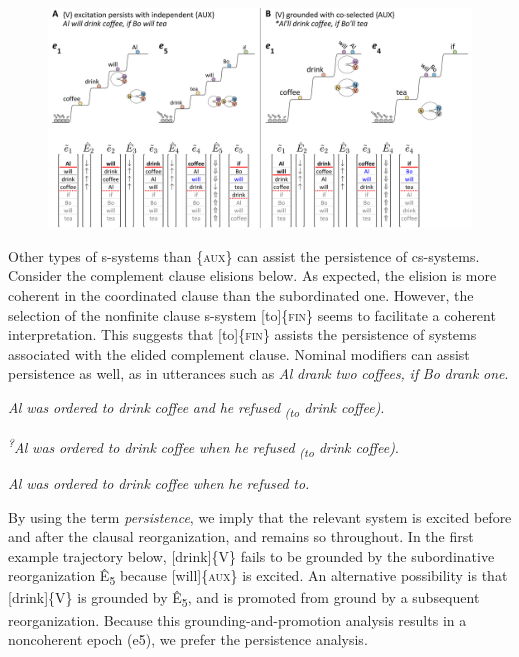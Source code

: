   
\begin{figure}
\includegraphics[width=\textwidth]{figures/Tilsen-img148.png}
\caption{\missingcaption}
\label{fig:}
\end{figure}
 

  Other types of s-systems than \{\textsc{aux}\} can assist the persistence of cs-systems. Consider the complement clause elisions below. As expected, the elision is more coherent in the coordinated clause than the subordinated one. However, the selection of the nonfinite clause s-system [to]\{\textsc{fin}\} seems to facilitate a coherent interpretation. This suggests that [to]\{\textsc{fin}\} assists the persistence of systems associated with the elided complement clause. Nominal modifiers can assist persistence as well, as in utterances such as \textit{Al} \textit{drank} \textit{two} \textit{coffees,} \textit{if} \textit{Bo} \textit{drank} \textit{one}.

\textit{Al} \textit{was} \textit{ordered} \textit{to} \textit{drink} \textit{coffee} \textit{and} \textit{he} \textit{refused} \textit{\textsubscript{(to} \textit{drink} \textit{coffee)}}.

\textit{\textsuperscript{?}}\textit{Al} \textit{was} \textit{ordered} \textit{to} \textit{drink} \textit{coffee} \textit{when} \textit{he} \textit{refused} \textit{\textsubscript{(to} \textit{drink} \textit{coffee)}}.

\textit{Al} \textit{was} \textit{ordered} \textit{to} \textit{drink} \textit{coffee} \textit{when} \textit{he} \textit{refused} \textit{to.}

  By using the term \textit{persistence}, we imply that the relevant system is excited before and after the clausal reorganization, and remains so throughout. In the first example trajectory below, [drink]\{V\} fails to be grounded by the subordinative reorganization Ê\textsubscript{5} because [will]\{\textsc{aux}\} is excited. An alternative possibility is that [drink]\{V\} is grounded by Ê\textsubscript{5},\textsubscript{} and is promoted from ground by a subsequent reorganization. Because this grounding-and-promotion analysis results in a noncoherent epoch (e5), we prefer the persistence analysis.

